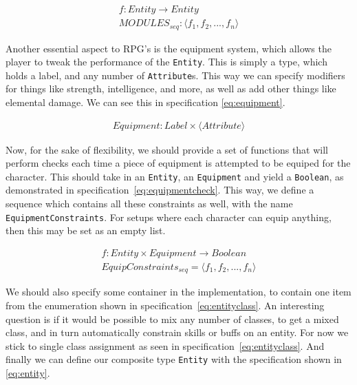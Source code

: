 \begin{equation}
\begin{split}
  \label{eq:funcmodules}
  f \colon Entity \to Entity \\
  MODULES_{seq}\colon \langle f_1, f_2, ..., f_n \rangle
\end{split}
\end{equation}

Another essential aspect to RPG's is the equipment system, which allows the
player to tweak the performance of the \texttt{Entity}. This is simply a type,
which holds a label, and any number of \texttt{Attribute}s. This way we can
specify modifiers for things like strength, intelligence, and more, as well as
add other things like elemental damage. We can see this in specification
\ref{eq:equipment}.

\begin{equation}
\begin{split}
  \label{eq:equipment}
  Equipment\colon Label \times \langle Attribute \rangle
\end{split}
\end{equation}

Now, for the sake of flexibility, we should provide a set of functions that will
perform checks each time a piece of equipment is attempted to be equiped for the
character. This should take in an \texttt{Entity}, an \texttt{Equipment} and
yield a \texttt{Boolean}, as demonstrated in
specification~\ref{eq:equipmentcheck}. This way, we define a sequence which
contains all these constraints as well, with the name
\texttt{EquipmentConstraints}. For setups where each character can equip
anything, then this may be set as an empty list.

\begin{equation}
\begin{split}
  \label{eq:equipmentcheck}
  f\colon Entity \times Equipment \to Boolean \\
  EquipConstraints_{seq} = \langle f_1, f_2, ..., f_n \rangle
\end{split}
\end{equation}

We should also specify some container in the implementation, to contain one item
from the enumeration shown in specification~\ref{eq:entityclass}. An interesting
question is if it would be possible to mix any number of classes, to get a mixed
class, and in turn automatically constrain skills or buffs on an entity. For now
we stick to single class assignment as seen in
specification~\ref{eq:entityclass}. And finally we can define our composite type
\texttt{Entity} with the specification shown in \ref{eq:entity}.

